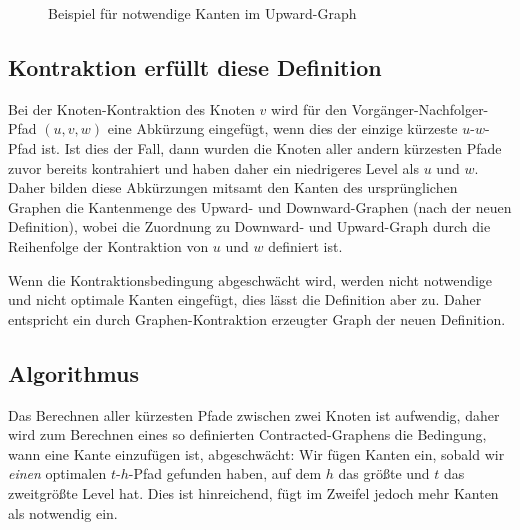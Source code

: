 \begin{figure}[h!]
  \centering
  \caption{Beispiel für notwendige Kanten im Upward-Graph}
  \label{fig:people:notwendige_kanten}
\end{figure}

\subsection{Kontraktion erfüllt diese Definition}

Bei der Knoten-Kontraktion des Knoten $v$ wird für den Vorgänger-Nachfolger-Pfad $(u, v, w)$ eine Abkürzung eingefügt, wenn dies der einzige kürzeste $u$-$w$-Pfad ist.
Ist dies der Fall, dann wurden die Knoten aller andern kürzesten Pfade zuvor bereits kontrahiert und haben daher ein niedrigeres Level als $u$ und $w$.
Daher bilden diese Abkürzungen mitsamt den Kanten des ursprünglichen Graphen die Kantenmenge des Upward- und Downward-Graphen (nach der neuen Definition), wobei die Zuordnung zu Downward- und Upward-Graph durch die Reihenfolge der Kontraktion von $u$ und $w$ definiert ist.

Wenn die Kontraktionsbedingung abgeschwächt wird, werden nicht notwendige und nicht optimale Kanten eingefügt, dies lässt die Definition aber zu.
Daher entspricht ein durch Graphen-Kontraktion erzeugter Graph der neuen Definition.

\subsection{Algorithmus}

Das Berechnen aller kürzesten Pfade zwischen zwei Knoten ist aufwendig, daher wird zum Berechnen eines so definierten Contracted-Graphens die Bedingung, wann eine Kante einzufügen ist, abgeschwächt:
Wir fügen Kanten ein, sobald wir \emph{einen} optimalen $t$-$h$-Pfad gefunden haben, auf dem $h$ das größte und $t$ das zweitgrößte Level hat.
Dies ist hinreichend, fügt im Zweifel jedoch mehr Kanten als notwendig ein.

